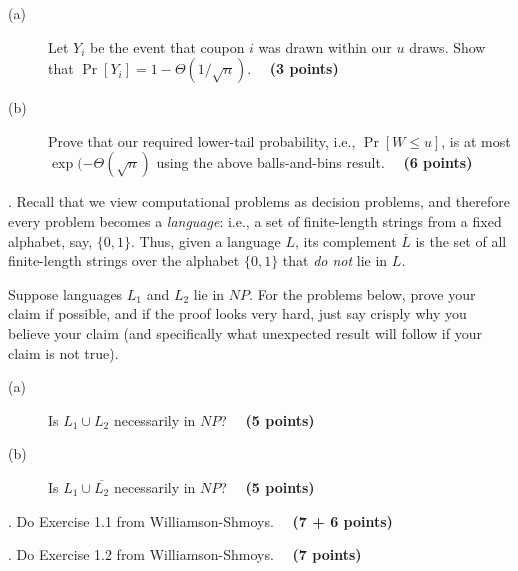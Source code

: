 \documentclass{article}[11pt]
\begin{document}
\begin{description}
\item[(a)] Let $Y_i$ be the event that coupon $i$ was drawn within our $u$ draws. Show that 
$\Pr[Y_i] = 1 - \Theta(1/\sqrt{n})$. ~~\textbf{(3 points)}

\item[(b)] Prove that our required lower-tail probability, i.e., $\Pr[W \leq u]$, is at most $\exp(-\Theta(\sqrt{n})$ using the above balls-and-bins result. ~~\textbf{(6 points)}
\end{description}

\medskip {}. Recall that we view computational problems as decision problems, and therefore every problem becomes a \emph{language}: i.e., a set of finite-length strings from a fixed alphabet, say, $\{0,1\}$. Thus, given a language $L$, its complement $\overline{L}$ is the set of all finite-length strings over the alphabet $\{0,1\}$ that \emph{do not} lie in $L$. 

Suppose languages $L_1$ and $L_2$ lie in $NP$. 
For the problems below, prove your claim if possible, and if the proof looks very hard, just say crisply why you believe your claim (and specifically what unexpected result will follow if your claim is not true). 

\begin{description}
\item[(a)] Is $L_1 \cup L_2$ necessarily in $NP$? ~~\textbf{(5 points)}

\item[(b)] Is $L_1 \cup \overline{L_2}$ necessarily in $NP$? ~~\textbf{(5 points)}
\end{description}



\medskip {}. Do Exercise 1.1 from Williamson-Shmoys. ~~\textbf{(7 + 6 points)}


\medskip {}. Do Exercise 1.2 from Williamson-Shmoys. ~~\textbf{(7 points)}
\end{document}
